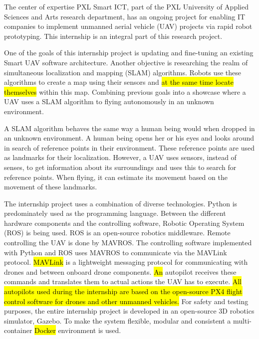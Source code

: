 The center of expertise PXL Smart ICT, part of the PXL University of Applied Sciences and Arts research department, has an ongoing project for enabling IT companies to implement unmanned aerial vehicle (UAV) projects via rapid robot prototyping. This internship is an integral part of this research project.

One of the goals of this internship project is updating and fine-tuning an existing Smart UAV software architecture. Another objective is researching the realm of simultaneous localization and mapping (SLAM) algorithms. Robots use these algorithms to create a map using their sensors and \hl{at the same time locate themselves} within this map. Combining previous goals into a showcase where a UAV uses a SLAM algorithm to flying autonomously in an unknown environment.

A SLAM algorithm behaves the same way a human being would when dropped in an unknown environment. A human being opens her or his eyes and looks around in search of reference points in their environment. These reference points are used as landmarks for their localization. However, a UAV uses sensors, instead of senses, to get information about its surroundings and uses this to search for reference points. When flying, it can estimate its movement based on the movement of these landmarks.

The internship project uses a combination of diverse technologies. Python is predominately used as the programming language. Between the different hardware components and the controlling software, Robotic Operating System (ROS) is being used. ROS is an open-source robotics middleware. Remote controlling the UAV is done by MAVROS. The controlling software implemented with Python and ROS uses MAVROS to communicate via the MAVLink protocol. \hl{MAVLink} is a lightweight messaging protocol for communicating with drones and between onboard drone components. \hl{An} autopilot receives these commands and translates them to actual actions the UAV has to execute. \hl{All autopilots used during the internship are based on the open-source PX4 flight control software for drones and other unmanned vehicles.} For safety and testing purposes, the entire internship project is developed in an open-source 3D robotics simulator, Gazebo. To make the system flexible, modular and consistent a multi-container \hl{Docker} environment is used.

